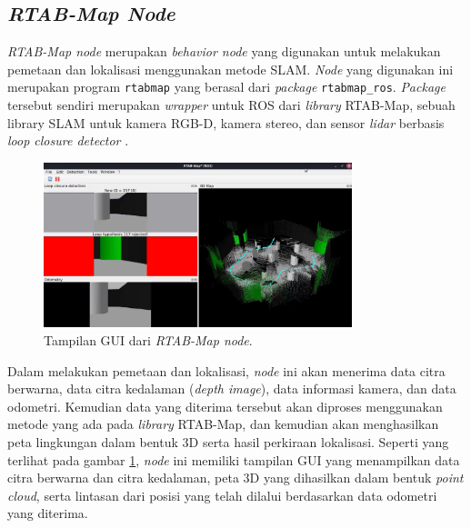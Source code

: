 \subsection{\emph{RTAB-Map Node}}
\label{subsec:rtabmapnode}

\emph{RTAB-Map node} merupakan \emph{behavior node} yang digunakan untuk melakukan pemetaan dan lokalisasi menggunakan metode SLAM.
\emph{Node} yang digunakan ini merupakan program \lstinline{rtabmap} yang berasal dari \emph{package} \lstinline{rtabmap_ros}.
\emph{Package} tersebut sendiri merupakan \emph{wrapper} untuk ROS dari \emph{library} RTAB-Map,
  sebuah library SLAM untuk kamera RGB-D, kamera stereo, dan sensor \emph{lidar} berbasis \emph{loop closure detector} \citep{cit:labbe2019}.

\begin{figure}[ht]
  \centering
  \includegraphics[width=0.8\textwidth,keepaspectratio]{gambar/tampilan-rtabmap.png}
  \caption{Tampilan GUI dari \emph{RTAB-Map node}.}
  \label{fig:tampilanrtabmap}
\end{figure}

Dalam melakukan pemetaan dan lokalisasi,
  \emph{node} ini akan menerima data citra berwarna,
  data citra kedalaman (\emph{depth image}),
  data informasi kamera,
  dan data odometri.
Kemudian data yang diterima tersebut akan diproses menggunakan metode yang ada pada \emph{library} RTAB-Map,
  dan kemudian akan menghasilkan peta lingkungan dalam bentuk 3D serta hasil perkiraan lokalisasi.
Seperti yang terlihat pada gambar \ref{fig:tampilanrtabmap},
  \emph{node} ini memiliki tampilan GUI yang menampilkan data citra berwarna dan citra kedalaman,
  peta 3D yang dihasilkan dalam bentuk \emph{point cloud},
  serta lintasan dari posisi yang telah dilalui berdasarkan data odometri yang diterima.
